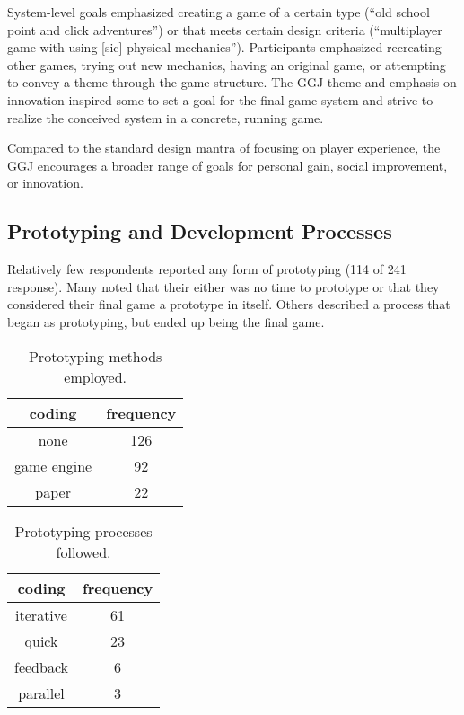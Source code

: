 \documentclass{sig-alternate}
\begin{document}
System-level goals emphasized creating a game of a certain type (``old school point and click adventures'') or that meets certain design criteria (``multiplayer game with using [sic] physical mechanics''). Participants emphasized recreating other games, trying out new mechanics, having an original game, or attempting to convey a theme through the game structure. The GGJ theme and emphasis on innovation inspired some to set a goal for the final game system and strive to realize the conceived system in a concrete, running game.

Compared to the standard design mantra of focusing on player experience, the GGJ encourages a broader range of goals for personal gain, social improvement, or innovation. 


\subsection{Prototyping and Development Processes}
Relatively few respondents reported any form of prototyping (114 of 241 response). Many noted that their either was no time to prototype or that they considered their final game a prototype in itself. Others described a process that began as prototyping, but ended up being the final game.

\begin{table}[tb]
\centering
\scriptsize
\begin{tabular}{|c|c|}
\hline coding & frequency \\ 
\hline none & 126 \\ 
\hline game engine & 92 \\ 
\hline paper & 22 \\ 
\hline 
\end{tabular} 
\caption{Prototyping methods employed.}
\label{tab:prototyping}
\end{table}

\begin{table}[tb]
\centering
\scriptsize
\begin{tabular}{|c|c|}
\hline coding & frequency \\ 
\hline iterative & 61 \\ 
\hline quick & 23 \\ 
\hline feedback & 6 \\ 
\hline parallel & 3 \\ 
\hline 
\end{tabular} 
\caption{Prototyping processes followed.}
\label{tab:proto_process}
\end{table}
\end{document}
